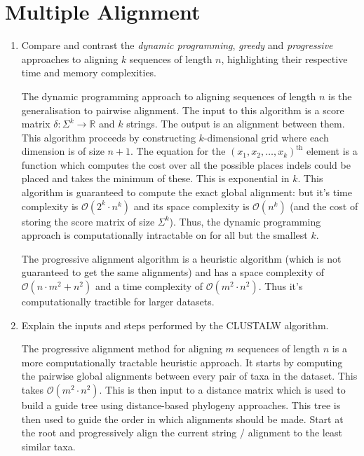 \documentclass[10pt,\jkfside,a4paper]{article}
\begin{document}
\section{Multiple Alignment}

\begin{enumerate}

    \item Compare and contrast the \textit{dynamic programming}, \textit{greedy} and \textit{progressive} approaches to aligning $k$ sequences of length $n$, highlighting their respective time and memory
    complexities.

    The dynamic programming approach to aligning sequences of length $n$ is the generalisation to pairwise alignment. The input to this algorithm is a score matrix $\delta: \Sigma^k \to \mathbb{R}$ and $k$
    strings. The output is an alignment between them. This algorithm proceeds by constructing $k$-dimensional grid where each dimension is of size $n + 1$. The equation for the $(x_1, x_2, \ldots, x_k)^\text{th}$
    element is a function which computes the cost over all the possible places indels could be placed and takes the minimum of these. This is exponential in $k$. This algorithm is guaranteed to compute the exact
    global alignment: but it's time complexity is $\mathcal O(2^k \cdot n^k)$ and its space complexity is $\mathcal O(n^k)$ (and the cost of storing the score matrix of size $\Sigma^k$). Thus, the dynamic
    programming approach is computationally intractable on for all but the smallest $k$.

    The progressive alignment algorithm is a heuristic algorithm (which is not guaranteed to get the same alignments) and has a space complexity of $\mathcal O(n \cdot m^2 + n^2)$ and a time complexity of
    $\mathcal O(m^2 \cdot n^2)$. Thus it's computationally tractible for larger datasets.

    \item Explain the inputs and steps performed by the CLUSTALW algorithm.

    The progressive alignment method for aligning $m$ sequences of length $n$ is a more computationally tractable heuristic approach. It starts by computing the pairwise global alignments between every pair of taxa
    in the dataset. This takes $\mathcal O(m^2 \cdot n^2)$. This is then input to a distance matrix which is used to build a guide tree \ie using distance-based phylogeny approaches. This tree is then used to guide
    the order in which alignments should be made. Start at the root and progressively align the current string / alignment to the least similar taxa.


\end{enumerate}
\end{document}
